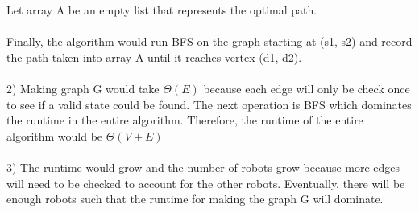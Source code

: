 \documentclass[12pt, a4paper]{article}
\begin{document}
Let array A be an empty list that represents the optimal path.
\\
\\
Finally, the algorithm would run BFS on the graph starting at (s1, s2) and record the path taken into array A until it reaches vertex (d1, d2).
\\
\\
2) Making graph G would take $\Theta(E)$ because each edge will only be check once to see if a valid state could be found.
The next operation is BFS which dominates the runtime in the entire algorithm.
Therefore, the runtime of the entire algorithm would be $\Theta(V + E)$
\\
\\
3) The runtime would grow and the number of robots grow because more edges will need to be checked to account for the other robots.
Eventually, there will be enough robots such that the runtime for making the graph G will dominate.
\\
\end{document}
